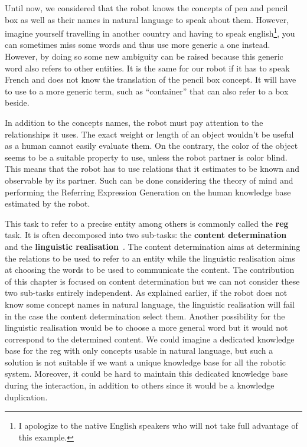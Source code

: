 Until now, we considered that the robot knows the concepts of pen and pencil box as well as their names in natural language to speak about them. However, imagine yourself travelling in another country and having to speak english\footnote{I apologize to the native English speakers who will not take full advantage of this example.}, you can sometimes miss some words and thus use more generic a one instead. However, by doing so some new ambiguity can be raised because this generic word also refers to other entities. It is the same for our robot if it has to speak French and does not know the translation of the pencil box concept. It will have to use to a more generic term, such as ``container'' that can also refer to a box beside.

In addition to the concepts names, the robot must pay attention to the relationships it uses. The exact weight or length of an object wouldn't be useful as a human cannot easily evaluate them. On the contrary, the color of the object seems to be a suitable property to use, unless the robot partner is color blind. This means that the robot has to use relations that it estimates to be known and observable by its partner. Such can be done considering the theory of mind and performing the Referring Expression Generation on the human knowledge base estimated by the robot.

This task to refer to a precise entity among others is commonly called the \textbf{\acrfull{reg}} task. It is often decomposed into two sub-tasks: the \textbf{content determination} and the \textbf{linguistic realisation}~\cite{krahmer_2012_computational}. The content determination aims at determining the relations to be used to refer to an entity while the linguistic realisation aims at choosing the words to be used to communicate the content. The contribution of this chapter is focused on content determination but we can not consider these two sub-tasks entirely independent. As explained earlier, if the robot does not know some concept names in natural language, the linguistic realisation will fail in the case the content determination select them. Another possibility for the linguistic realisation would be to choose a more general word but it would not correspond to the determined content. We could imagine a dedicated knowledge base for the \acrshort{reg} with only concepts usable in natural language, but such a solution is not suitable if we want a unique knowledge base for all the robotic system. Moreover, it could be hard to maintain this dedicated knowledge base during the interaction, in addition to others since it would be a knowledge duplication.

